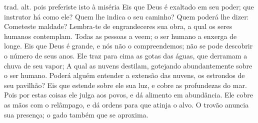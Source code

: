 {{trad. alt. pois preferiste isto à miséria
}
Eis que Deus é exaltado em seu poder; que instrutor há como ele?
Quem lhe indica o seu caminho? Quem poderá lhe dizer: Cometeste maldade?
Lembra-te de engrandeceres sua obra, a qual os seres humanos contemplam.
Todas as pessoas a veem; o ser humano a enxerga de longe.
Eis que Deus é grande, e nós não o compreendemos; não se pode descobrir o número de seus anos.
Ele traz para cima as gotas das águas, que derramam a chuva de seu vapor;
A qual as nuvens destilam, gotejando abundantemente sobre o ser humano.
Poderá alguém entender a extensão das nuvens,
{} os estrondos de seu pavilhão?
Eis que estende sobre ele sua luz, e cobre as profundezas
 do mar.
Pois por estas coisas ele julga aos povos, e dá alimento em abundância.
Ele cobre as mãos com o relâmpago, e dá ordens para que atinja o alvo.
O trovão anuncia sua presença; o gado também
{} que se aproxima.

}

